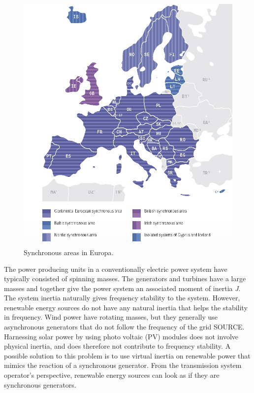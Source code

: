 \documentclass[class=book, crop=false]{standalone}
\begin{document}
\begin{figure}[H]
    \center
    \includegraphics[height=13cm, width=14cm]{figures/ENTSO-E-member-states.png}
    \caption[size = 9]{Synchronous areas in Europa\cite{synchronous_regions}.}
    \label{fig:theory:entso-synchronous-area}
\end{figure}

The power producing units in a conventionally electric power system have typically consisted of spinning masses. The generators and turbines have a large masses and together give the power system an associated moment of inertia \textit{J}. The system inertia naturally gives frequency stability to the system. However, renewable energy sources do not have any natural inertia that helps the stability in frequency. Wind power have rotating masses, but they generally use asynchronous generators that do not follow the frequency of the grid SOURCE. Harnessing solar power by using photo voltaic (PV) modules does not involve physical inertia, and does therefore not contribute to frequency stability. A possible solution to this problem is to use virtual inertia on renewable power that mimics the reaction of a synchronous generator\cite{virtual_inertia}. From the transmission system operator's perspective, renewable energy sources can look as if they are synchronous generators.
\end{document}
